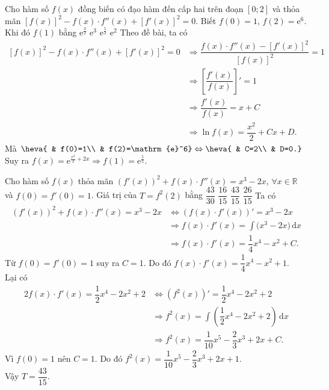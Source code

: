 \begin{ex}%
	Cho hàm số $ f(x)$ đồng biến có đạo hàm đến cấp hai trên đoạn $\left[0;2\right]$ và thỏa mãn $\left[f(x)\right]^2-f(x)\cdot f''(x)+\left[f'(x)\right]^2=0$. Biết $ f(0)=1$, $ f(2)={\mathrm{e}}^6$. Khi đó $ f(1)$ bằng
	\choice
	{$\mathrm{e}^{\tfrac{3}{2}}$}
	{$\mathrm{e}^3$}
	{\True $\mathrm{e}^{\tfrac{5}{2}}$}
	{$\mathrm{e}^2$}
	\loigiai
	{
		Theo đề bài, ta có
		\begin{align*}
			\left[f(x)\right]^2-f(x)\cdot f''(x)+\left[f'(x)\right]^2=0 &\Rightarrow\dfrac{f(x)\cdot f''(x)-\left[f'(x)\right]^2}{\left[f(x)\right]^2}=1\\
			&\Rightarrow{\left[\dfrac{f'(x)}{f(x)}\right]'}=1\\& \Rightarrow\dfrac{f'(x)}{f(x)}=x+C\\
			&\Rightarrow\ln f(x)=\dfrac{x^2}{2}+Cx+D.
		\end{align*}
		Mà $\heva{
			& f(0)=1\\ 
			& f(2)=\mathrm{e}^6} \Leftrightarrow\heva{
			& C=2\\ 
			& D=0.}$\\
		Suy ra $f(x)=\mathrm{e}^{\tfrac{x^2}{2}+2x}\Rightarrow f(1)=\mathrm{e}^{\tfrac{5}{2}}$.}
\end{ex}
\begin{ex}%
	Cho hàm số $ f(x)$ thỏa mãn $(f'(x))^2+f(x)\cdot f''(x)=x^3-2x$, $\forall x\in\mathbb{R}$ và  $ f(0)=f'(0)=1$. Giá trị của $ T=f^2(2)$ bằng
	\choice
	{$\dfrac{43}{30}$}
	{$\dfrac{16}{15}$}
	{\True $\dfrac{43}{15}$}
	{$\dfrac{26}{15}$}
	\loigiai
	{
		Ta có
		\begin{align*}
		\left( f'(x)\right)^2+f(x)\cdot f''(x)=x^3-2x & \Leftrightarrow \left( f(x)\cdot f'(x)\right)'=x^3-2x\\& \Rightarrow f(x)\cdot f'(x)=\displaystyle\int{(x^3-2x})\mathrm{\,d} x\\&\Rightarrow f(x)\cdot f'(x)=\dfrac{1}{4}{x^4}-x^2+C.
		\end{align*}
		Từ $ f(0)=f'(0)=1$ suy ra $C=1$. Do đó $ f(x)\cdot f'(x)=\dfrac{1}{4}{x^4}-x^2+1$.\\
	Lại có
	\begin{align*}
		2f(x)\cdot f'(x)=\dfrac{1}{2}{x^4}-2x^2+2 & \Leftrightarrow \left( f^2(x)\right) '=\dfrac{1}{2}{x^4}-2x^2+2\\& \Rightarrow{f^2}(x)=\displaystyle\int{\left(\dfrac{1}{2}{x^4}-2x^2+2\right)}\mathrm{\,d} x\\& \Rightarrow{f^2}(x)=\dfrac{1}{10}{x^5}-\dfrac{2}{3}{x^3}+2x+C.
	\end{align*}
		Vì $ f(0)=1$ nên $C=1$. Do đó $f^2(x)=\dfrac{1}{10}{x^5}-\dfrac{2}{3}{x^3}+2x+1$.\\
	Vậy $T=\dfrac{43}{15}$.}
\end{ex}

